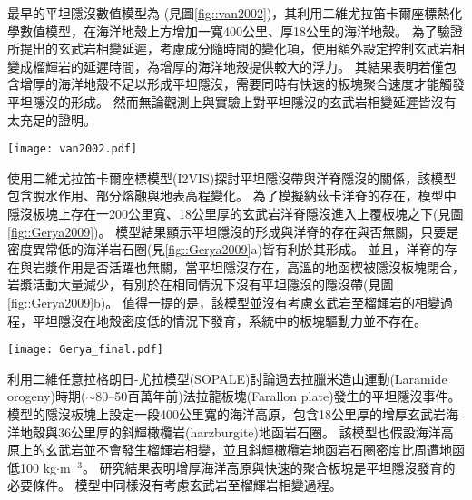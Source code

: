 最早的平坦隱沒數值模型為\citealp{van2002role} (見圖\ref{fig::van2002})，其利用二維尤拉笛卡爾座標熱化學數值模型，在海洋地殼上方增加一寬400公里、厚18公里的海洋地殼。
為了驗證\citealp{Gutscher2000A}所提出的玄武岩相變延遲，\citealp{van2002role}考慮成分隨時間的變化項，使用額外設定控制玄武岩相變成榴輝岩的延遲時間，為增厚的海洋地殼提供較大的浮力。
其結果表明若僅包含增厚的海洋地殼不足以形成平坦隱沒，需要同時有快速的板塊聚合速度才能觸發平坦隱沒的形成。
然而無論觀測上與實驗上對平坦隱沒的玄武岩相變延遲皆沒有太充足的證明。

\begin{figure*}[ht!]
    \centering
    \texttt{[image: van2002.pdf]}
    \caption[正常的隱沒帶與包含海洋高原的隱沒帶隨模型時間變化，摘自\citealp{van2002role}]{正常的隱沒帶(左)與包含海洋高原的隱沒帶(右)隨模型時間變化，摘自\citealp{van2002role}。黑白區域繪出海洋地殼的化學成分從玄武岩(黑)到榴輝岩(白)的變化。水平軸為與海溝的距離，背景顏色為溫度。
    }
    \label{fig::van2002}
\end{figure*}

\citealp{Gerya2009}使用二維尤拉笛卡爾座標模型(I2VIS)探討平坦隱沒帶與洋脊隱沒的關係，該模型包含脫水作用、部分熔融與地表高程變化。
為了模擬納茲卡洋脊的存在，模型中隱沒板塊上存在一200公里寬、18公里厚的玄武岩洋脊隱沒進入上覆板塊之下(見圖\ref{fig::Gerya2009})。
模型結果顯示平坦隱沒的形成與洋脊的存在與否無關，只要是密度異常低的海洋岩石圈(見\ref{fig::Gerya2009}a)皆有利於其形成。
並且，洋脊的存在與岩漿作用是否活躍也無關，當平坦隱沒存在，高溫的地函楔被隱沒板塊閉合，岩漿活動大量減少，有別於在相同情況下沒有平坦隱沒的隱沒帶(見圖\ref{fig::Gerya2009}b)。
值得一提的是，該模型並沒有考慮玄武岩至榴輝岩的相變過程，平坦隱沒在地殼密度低的情況下發育，系統中的板塊驅動力並不存在。

\begin{figure*}[ht!]
    \centering
    \texttt{[image: Gerya\_final.pdf]}
    \caption[\citealp{Gerya2009}平坦隱沒模型結果]{\citealp{Gerya2009}中平坦隱沒模型於第12個百萬年的結果。圖組(a)與圖組(b)分別為隱沒海洋地函岩石圈密度$3100 kgm^{-3}$與$3300 kgm^{-3}$的結果。(a)上圖與(b)上圖為包含洋脊隱沒的模型，(a)(b)下圖為不包含洋脊的模型，圖中白線為等溫線。其中，顏色代表不同岩相：1、2=大陸地殼、3、4=沉積物、5、6=玄武岩、7、8=輝長岩、9、10=無水地函、11=蛇紋岩、12、13、14=含水地函。
    }
    \label{fig::Gerya2009}
\end{figure*}

\citealp{Liu2016}利用二維任意拉格朗日-尤拉模型(SOPALE)討論過去拉臘米造山運動(Laramide orogeny)時期($\sim$80–50百萬年前)法拉龍板塊(Farallon plate)發生的平坦隱沒事件。
模型的隱沒板塊上設定一段400公里寬的海洋高原，包含18公里厚的增厚玄武岩海洋地殼與36公里厚的斜輝橄欖岩(harzburgite)地函岩石圈。
該模型也假設海洋高原上的玄武岩並不會發生榴輝岩相變，並且斜輝橄欖岩地函岩石圈密度比周遭地函低100 kg$\cdot$m$^{-3}$。
研究結果表明增厚海洋高原與快速的聚合板塊是平坦隱沒發育的必要條件。
模型中同樣沒有考慮玄武岩至榴輝岩相變過程。

